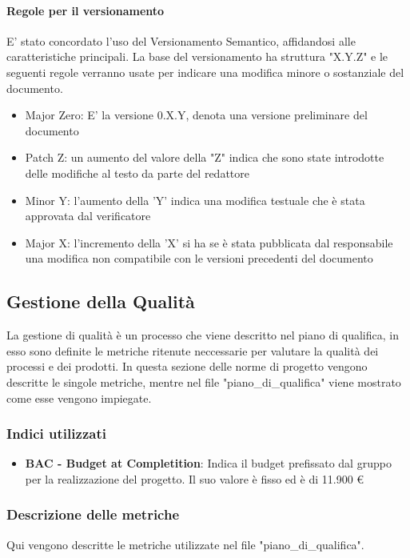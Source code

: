\documentclass[12pt]{article}
\begin{document}
\paragraph{Regole per il versionamento}
\label{ver}
E' stato concordato l'uso del Versionamento Semantico, affidandosi alle caratteristiche principali.
La base del versionamento ha struttura "X.Y.Z" e le seguenti regole verranno usate per indicare una modifica minore o sostanziale del documento.
\begin{itemize}
    \item Major Zero: E' la versione 0.X.Y, denota una versione preliminare del documento
    \item Patch Z: un aumento del valore della "Z" indica che sono state introdotte delle modifiche al testo da parte del redattore
    \item Minor Y: l'aumento della 'Y' indica una modifica testuale che è stata approvata dal verificatore
    \item Major X: l'incremento della 'X' si ha se è stata pubblicata dal responsabile una modifica non compatibile con le versioni precedenti del documento
\end{itemize}

\subsection{Gestione della Qualità}
La gestione di qualità è un processo che viene descritto nel piano di qualifica, in esso sono definite le metriche ritenute neccessarie per valutare la qualità dei processi e dei prodotti.
In questa sezione delle norme di progetto vengono descritte le singole metriche, mentre nel file "piano\_di\_qualifica" viene mostrato come esse vengono impiegate.

\subsubsection{Indici utilizzati}
\begin{itemize}
    \item \textbf{BAC - Budget at Completition}: Indica il budget prefissato dal gruppo per la realizzazione del progetto. Il suo valore è fisso ed è di 11.900 \euro
\end{itemize}

\subsubsection{Descrizione delle metriche}
Qui vengono descritte le metriche utilizzate nel file "piano\_di\_qualifica".
\end{document}
